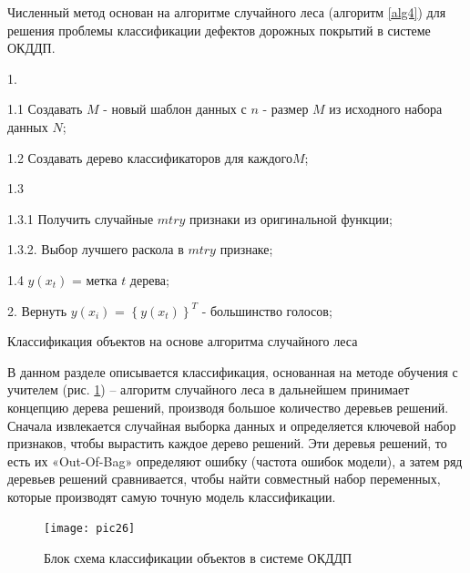 Численный метод основан на алгоритме случайного леса (алгоритм \ref{alg4}) для решения проблемы классификации дефектов дорожных покрытий в системе ОКДДП.
\begin{algorithm}[ht!]
   1. 
     {
		1.1 Создавать $M$ - новый шаблон данных с $n$ - размер $M$ из исходного набора данных $N$;

		1.2 Создавать дерево классификаторов для каждого$M$;

		1.3 
     {
		  1.3.1 Получить случайные  $mtry$ признаки из оригинальной функции;

			1.3.2. Выбор лучшего раскола в $mtry$ признаке;
		}
		1.4 $y\left(x_t\right)$ = метка $t$ дерева;
		}

		2. Вернуть $y\left(x_i\right)$ = $\left\{y\left(x_t\right)\right\}^T$ - большинство голосов;

  \caption{Классификация объектов на основе алгоритма случайного леса}\label{alg4}

\end{algorithm}

В данном разделе описывается классификация, основанная на методе обучения с учителем (рис. \ref{pic26}) -- алгоритм случайного леса в дальнейшем принимает концепцию дерева решений, производя большое количество деревьев решений. Сначала извлекается случайная выборка данных и определяется ключевой набор признаков, чтобы вырастить каждое дерево решений. Эти деревья решений, то есть их «Out-Of-Bag» определяют ошибку (частота ошибок модели), а затем ряд деревьев решений сравнивается, чтобы найти совместный набор переменных, которые производят самую точную модель классификации.

\begin{figure}[ht!]
\centering
\texttt{[image: pic26]}
\caption{Блок схема классификации объектов в системе ОКДДП}
	\label{pic26}
		\end{figure}

